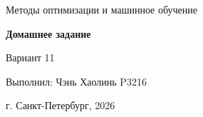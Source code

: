 \begin{titlepage}
    \centering
    \vspace*{3cm}

    Методы оптимизации и машинное обучение

    \vspace{1cm}
    \textbf{Домашнее задание}

    \vspace{0.5cm}
    Вариант 11

    \vfill

    \flushright
    Выполнил: Чэнь Хаолинь P3216\\

    \vspace{2cm}

    \centering
    г. Санкт-Петербург, 2026

\end{titlepage}
